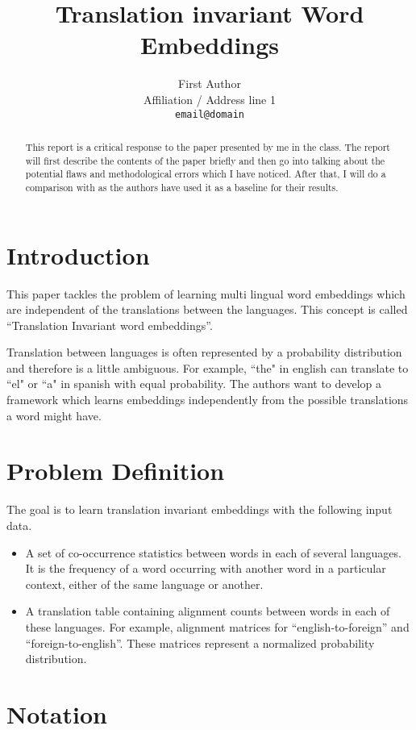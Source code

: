 \documentclass[11pt]{article}
\title{Translation invariant Word Embeddings}
\author{First Author \\
  Affiliation / Address line 1 \\
  {\tt email@domain}}
\date{}
\begin{document}
\maketitle
\begin{abstract}
This report is a critical response to the paper \cite{huang2015translation} presented by me in the class. The report will first describe the contents of the paper briefly and then go into talking about the potential flaws and methodological errors which I have noticed. After that, I will do a comparison with \cite{faruqui2014improving} as the authors have used it as a baseline for their results.
\end{abstract}

\section{Introduction}
This paper tackles the problem of learning multi lingual word embeddings which are independent of the translations between the languages.  This concept is called “Translation Invariant word embeddings”.

Translation between languages is often represented by a probability distribution and therefore is a little ambiguous. For example, ``the" in english can translate to ``el" or ``a" in spanish with equal probability. The authors want to develop a framework which learns embeddings independently from the possible translations a word might have.

\section{Problem Definition}
The goal is to learn translation invariant embeddings with the following input data.
\begin{itemize}
\item A set of co-occurrence statistics between words in each of several languages. It is the frequency of a word occurring with another word in a particular context, either of the same language or another. 
\item A translation table containing alignment counts between words in each of these languages. For example, alignment matrices for “english-to-foreign” and “foreign-to-english”. These matrices represent a normalized probability distribution.
\end{itemize}

\section{Notation}
\end{document}
